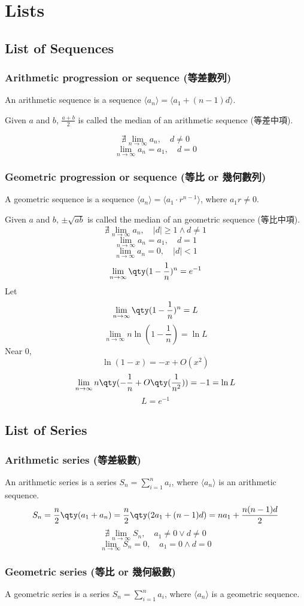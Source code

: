 \section{Lists}
\subsection{List of Sequences}
\subsubsection{Arithmetic progression or sequence (等差數列)}
An arithmetic sequence is a sequence $\langle a_n\rangle=\langle a_1+(n-1)d\rangle$. 

Given $a$ and $b$, $\frac{a+b}{2}$ is called the median of an arithmetic sequence (等差中項).

\[\nexists\lim_{n\to\infty}a_n,\quad d\neq 0\]
\[\lim_{n\to\infty}a_n=a_1,\quad d=0\]
\subsubsection{Geometric progression or sequence (等比 or 幾何數列)}
A geometric sequence is a sequence $\langle a_n\rangle=\langle a_1\cdot r^{n-1}\rangle$, where $a_1r\neq 0$.

Given $a$ and $b$, $\pm\sqrt{ab}$ is called the median of an geometric sequence (等比中項).
\[\nexists\lim_{n\to\infty}a_n,\quad |d|\geq 1\land d\neq 1\]
\[\lim_{n\to\infty}a_n=a_1,\quad d=1\]
\[\lim_{n\to\infty}a_n=0,\quad |d|<1\]
\[\lim_{n\to\infty}\qty(1-\frac{1}{n})^n=e^{-1}\]
\bpr
Let
\[\lim_{n\to\infty}\qty(1-\frac{1}{n})^n=L\]
\[\lim_{n\to\infty}n\ln(1-\frac{1}{n})=\ln L\]
Near 0,
\[\ln(1-x)=-x+O(x^2)\]
\[\lim_{n\to\infty}n\qty(-\frac{1}{n}+O\qty(\frac{1}{n^2}))=-1=\ln L\]
\[L=e^{-1}\]
\epr
\subsection{List of Series}
\subsubsection{Arithmetic series (等差級數)}
An arithmetic series is a series $S_n=\sum_{i=1}^na_i$, where $\langle a_n\rangle$ is an arithmetic sequence.
\[S_n=\frac{n}{2}\qty(a_1+a_n)=\frac{n}{2}\qty(2a_1+(n-1)d)=na_1+\frac{n(n-1)d}{2}\]
\[\nexists\lim_{n\to\infty}S_n,\quad a_1\neq 0\lor d\neq 0\]
\[\lim_{n\to\infty}S_n=0,\quad a_1=0\land d=0\]
\subsubsection{Geometric series (等比 or 幾何級數)}
A geometric series is a series $S_n=\sum_{i=1}^na_i$, where $\langle a_n\rangle$ is a geometric sequence.

